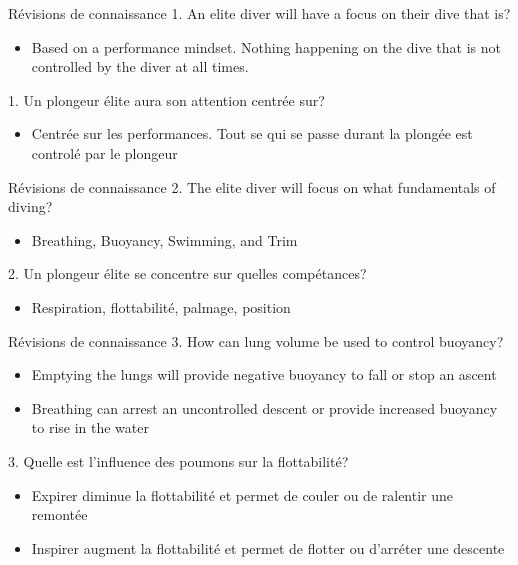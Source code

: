 
\begin{frame}{Révisions de connaissance}  
	1. An elite diver will have a focus on their dive that is?
	\begin{itemize}
		\item Based on a performance mindset. Nothing happening on the dive that is not controlled by the diver at all times.
	\end{itemize}

	\vfill

	1. Un plongeur élite aura son attention centrée sur?
	\begin{itemize}
		\item Centrée sur les performances. Tout se qui se passe durant la plongée est controlé par le plongeur
	\end{itemize}
\end{frame}

\begin{frame}{Révisions de connaissance}  
	2. The elite diver will focus on what fundamentals of diving?
	\begin{itemize}
		\item Breathing, Buoyancy, Swimming, and Trim
	\end{itemize}

	\vfill

	2. Un plongeur élite se concentre sur quelles compétances?
	\begin{itemize}
		\item Respiration, flottabilité, palmage, position
	\end{itemize}
\end{frame}

\begin{frame}{Révisions de connaissance}  
	3. How can lung volume be used to control buoyancy?
	\begin{itemize}
		\item Emptying the lungs will provide negative buoyancy to fall or stop an ascent
		\item Breathing can arrest an uncontrolled descent or provide increased buoyancy to rise in the water
	\end{itemize}

	\vfill

	3. Quelle est l'influence des poumons sur la flottabilité?
	\begin{itemize}
		\item Expirer diminue la flottabilité et permet de couler ou de ralentir une remontée
		\item Inspirer augment la flottabilité et permet de flotter ou d'arréter une descente
	\end{itemize}
\end{frame}

